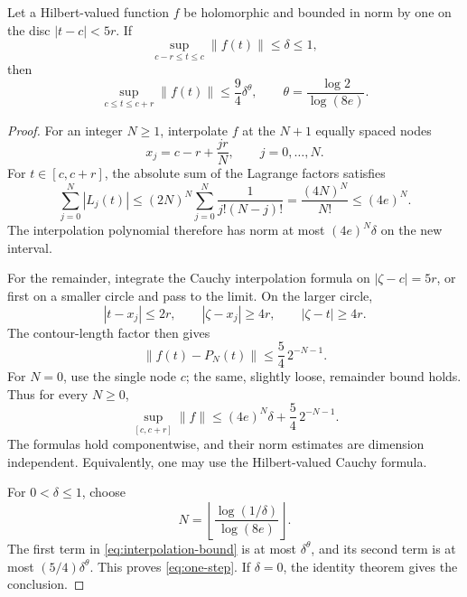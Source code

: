 \begin{lemma}
\label{lem:one-step}
Let a Hilbert-valued function $f$ be holomorphic and bounded in norm by one on the disc $|t-c|<5r$. If
\[
 \sup_{c-r\leq t\leq c}\|f(t)\|\leq\delta\leq1,
\]
then
\begin{equation}
 \sup_{c\leq t\leq c+r}\|f(t)\|
 \leq\frac94\delta^\theta,
 \qquad \theta=\frac{\log2}{\log(8e)}.
 \label{eq:one-step}
\end{equation}
\end{lemma}

\begin{proof}
For an integer $N\geq1$, interpolate $f$ at the $N+1$ equally spaced nodes
\[
 x_j=c-r+\frac{jr}{N},\qquad j=0,\ldots,N.
\]
For $t\in[c,c+r]$, the absolute sum of the Lagrange factors satisfies
\[
 \sum_{j=0}^N|L_j(t)|
 \leq(2N)^N\sum_{j=0}^N\frac1{j!(N-j)!}
 =\frac{(4N)^N}{N!}\leq(4e)^N.
\]
The interpolation polynomial therefore has norm at most $(4e)^N\delta$ on the new interval.

For the remainder, integrate the Cauchy interpolation formula on $|\zeta-c|=5r$, or first on a smaller circle and pass to the limit. On the larger circle,
\[
 |t-x_j|\leq2r,\qquad |\zeta-x_j|\geq4r,
 \qquad |\zeta-t|\geq4r.
\]
The contour-length factor then gives
\[
 \|f(t)-P_N(t)\|\leq\frac54\,2^{-N-1}.
\]
For $N=0$, use the single node $c$; the same, slightly loose, remainder bound holds. Thus for every $N\geq0$,
\begin{equation}
 \sup_{[c,c+r]}\|f\|
 \leq(4e)^N\delta+\frac54\,2^{-N-1}.
 \label{eq:interpolation-bound}
\end{equation}
The formulas hold componentwise, and their norm estimates are dimension independent. Equivalently, one may use the Hilbert-valued Cauchy formula.

For $0<\delta\leq1$, choose
\[
 N=\left\lfloor\frac{\log(1/\delta)}{\log(8e)}\right\rfloor.
\]
The first term in \eqref{eq:interpolation-bound} is at most $\delta^\theta$, and its second term is at most $(5/4)\delta^\theta$. This proves \eqref{eq:one-step}. If $\delta=0$, the identity theorem gives the conclusion.
\end{proof}

